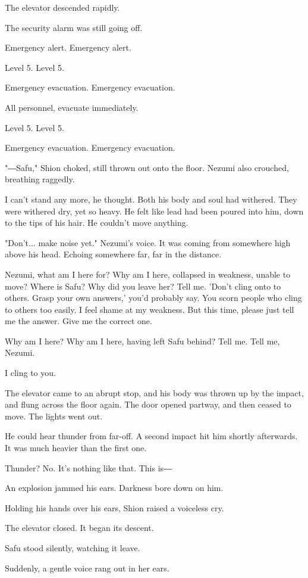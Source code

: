 The elevator descended rapidly.~

The security alarm was still going off.

Emergency alert. Emergency alert.

Level 5. Level 5.

Emergency evacuation. Emergency evacuation.

All personnel, evacuate immediately.~

Level 5. Level 5.

Emergency evacuation. Emergency evacuation.

"―Safu," Shion choked, still thrown out onto the floor. Nezumi also
crouched, breathing raggedly.

I can't stand any more, he thought. Both his body and soul had withered.
They were withered dry, yet so heavy. He felt like lead had been poured
into him, down to the tips of his hair. He couldn't move anything.

"Don't... make noise yet." Nezumi's voice. It was coming from somewhere
high above his head. Echoing somewhere far, far in the distance.

Nezumi, what am I here for? Why am I here, collapsed in weakness, unable
to move? Where is Safu? Why did you leave her? Tell me. 'Don't cling
onto to others. Grasp your own answers,' you'd probably say. You scorn
people who cling to others too easily. I feel shame at my weakness. But
this time, please just tell me the answer. Give me the correct one.

Why am I here? Why am I here, having left Safu behind? Tell me. Tell me,
Nezumi.

I cling to you.

The elevator came to an abrupt stop, and his body was thrown up by the
impact, and flung across the floor again. The door opened partway, and
then ceased to move. The lights went out.

He could hear thunder from far-off. A second impact hit him shortly
afterwards. It was much heavier than the first one.

Thunder? No. It's nothing like that. This is―

An explosion jammed his ears. Darkness bore down on him.

Holding his hands over his ears, Shion raised a voiceless cry.

The elevator closed. It began its descent.

Safu stood silently, watching it leave.

Suddenly, a gentle voice rang out in her ears.

